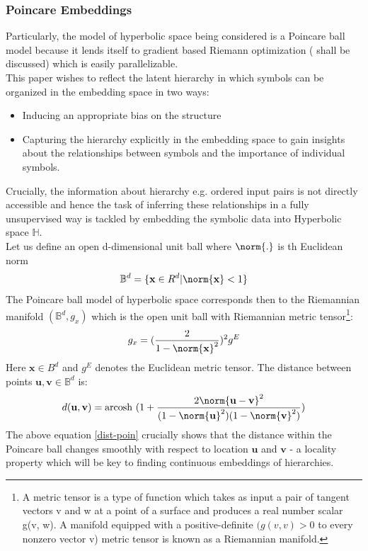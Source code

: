 \subsubsection{Poincare Embeddings}
Particularly, the model of hyperbolic space being considered is a Poincare ball model because it lends itself to gradient based Riemann optimization ( shall be discussed) which is easily parallelizable.
\\This paper wishes to reflect the latent hierarchy in which symbols can be organized in the embedding space in two ways:
\begin{itemize}
    \item Inducing an appropriate bias on the structure 
    \item Capturing the hierarchy explicitly in the embedding space to gain insights about the relationships between symbols and the importance of individual symbols.
\end{itemize}
Crucially, the information about hierarchy e.g. ordered input pairs is not directly accessible and hence the task of inferring these relationships in a fully unsupervised way is tackled by embedding the symbolic data into Hyperbolic space $\mathbb{H}$.
\bigskip
\\Let us define an open d-dimensional unit ball where $\norm{.}$ is th Euclidean norm 
$$\mathbb{B}^d = \{\mathbf{x} \in R^d | \norm{\mathbf{x}}<1\}$$
The Poincare ball model of hyperbolic space corresponds then to the Riemannian manifold $(\mathbb{B}^d,g_x)$ which is the open unit ball with Riemannian metric tensor\footnote[1]{A metric tensor is a type of function which takes as input a pair of tangent vectors v and w at a point of a surface and produces a real number scalar g(v, w).  A manifold equipped with a positive-definite $(g(v, v) > 0$ to every nonzero vector v) metric tensor is known as a Riemannian manifold.}:
$$g_x = (\frac{2}{1 - \norm{\mathbf{x}}^2})^2 g^E$$
Here $\mathbf{x} \in B^d$ and $g^E$ denotes the Euclidean metric tensor. The distance between points $\mathbf{u,v}\in \mathbb{B}^d$ is:
\begin{equation}
    d(\mathbf{u,v}) = \text{arcosh }(1+ \frac{2 \norm{\mathbf{u - v}}^2}{(1 - \norm{\mathbf{u}}^2)(1 - \norm{\mathbf{v}}^2)})\label{dist-poin}
\end{equation}
The above equation \ref{dist-poin} crucially shows that the distance within the Poincare ball changes smoothly with respect to location $\mathbf{u}$ and $\mathbf{v}$ - a locality property which will be key to finding continuous embeddings of hierarchies.
